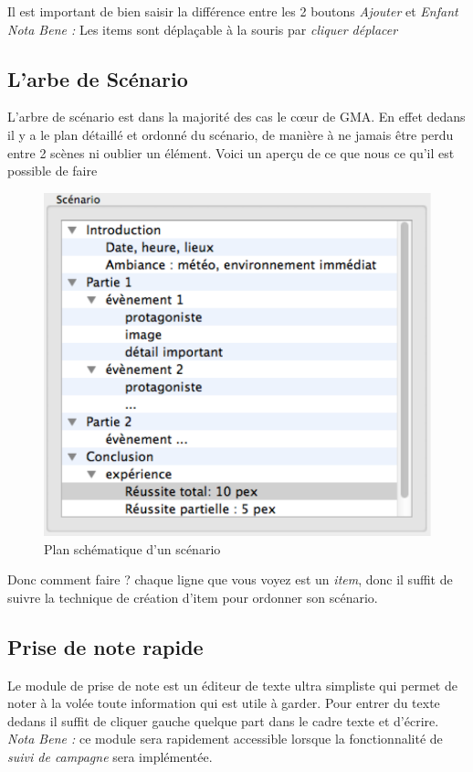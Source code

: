 \documentclass[12pt]{article}
\begin{document}
Il est important de bien saisir la différence entre les 2 boutons \emph{Ajouter} et \emph{Enfant}
\emph{Nota Bene :} Les items sont déplaçable à la souris par \emph{cliquer déplacer}

\subsection{L'arbe de Scénario}\label{scenario}
L'arbre de scénario est dans la majorité des cas le cœur de GMA. En effet dedans il y a le plan détaillé et ordonné du scénario, de manière à ne jamais être perdu entre 2 scènes ni oublier un élément.
Voici un aperçu de ce que nous ce qu'il est possible de faire
\begin{figure}
    \includegraphics[scale=0.5]{scenario_type}
    \caption{Plan schématique d'un scénario}
\end{figure}
Donc comment faire ?
chaque ligne que vous voyez est un \emph{item}, donc il suffit de suivre la technique de création d'item pour ordonner son scénario.


\subsection{Prise de note rapide}
Le module de prise de note est un éditeur de texte ultra simpliste qui permet de noter à la volée toute information qui est utile à garder. Pour entrer du texte dedans il suffit de cliquer gauche quelque part dans le cadre texte et d'écrire.\\
\emph{Nota Bene :} ce module sera rapidement accessible lorsque la fonctionnalité de \emph{suivi de campagne} sera implémentée.
\end{document}
